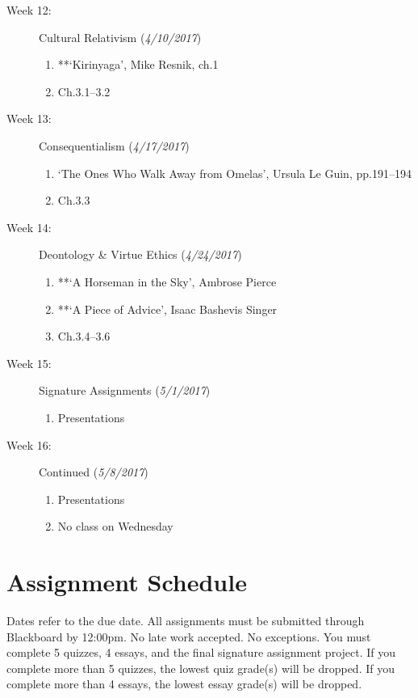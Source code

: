 \documentclass[article,oneside]{memoir}
\begin{document}
\begin{description}
\item[Week 12:] Cultural Relativism  (\emph{4/10/2017})
\begin{enumerate}
\item **`Kirinyaga', Mike Resnik, ch.1
\item Ch.3.1--3.2
\end{enumerate}

\item[Week 13:]  Consequentialism (\emph{4/17/2017})
\begin{enumerate}
\item  `The Ones Who Walk Away from Omelas', Ursula Le Guin, pp.191--194 
\item Ch.3.3
\end{enumerate}

\item[Week 14:]  Deontology \& Virtue Ethics  (\emph{4/24/2017})
\begin{enumerate}
\item **`A Horseman in the Sky', Ambrose Pierce
\item **`A Piece of Advice', Isaac Bashevis Singer
\item Ch.3.4--3.6
\end{enumerate}

\item[Week 15:]  Signature Assignments (\emph{5/1/2017})
\begin{enumerate}
\item Presentations
\end{enumerate} 

\item[Week 16:]  Continued (\emph{5/8/2017})
\begin{enumerate}
\item Presentations 
\item No class on Wednesday

\end{enumerate}




\end{description}





\section{ Assignment Schedule}
Dates refer to the due date. All assignments must be submitted through Blackboard by 12:00pm. No late work accepted. No exceptions. You must complete 5 quizzes, 4 essays, and the final signature assignment project.  If you complete more than 5 quizzes, the lowest quiz grade(s) will be dropped. If you complete more than 4 essays, the lowest essay grade(s) will be dropped. 
\end{document}
